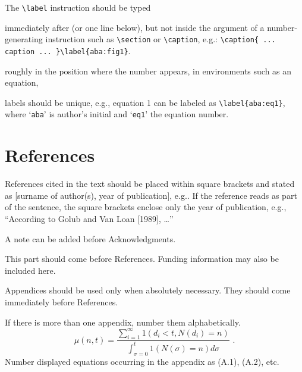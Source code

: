 \documentclass{ws-ijbc}
\begin{document}
The \verb|\label| instruction should be typed
\begin{itemlist}
\item immediately after (or one line below), but not inside the argument of
a number-generating instruction such as \verb|\section| or \verb|\caption|, e.g.:
\verb|\caption{ ... caption ... }\label{aba:fig1}|.
\item roughly in the position where the number appears, in environments
such as an equation,
\item labels should be unique, e.g., equation 1 can be labeled as
\verb|\label{aba:eq1}|, where `{\tt aba}' is author's initial and
`{\tt eq1}' the equation number.
\end{itemlist}

\section{References}
References cited in the text should be placed within square
brackets and stated as [surname of author(s), year of
publication], e.g.. If the reference reads as part of
the sentence, the square brackets enclose only the year of
publication, e.g., ``According to Golub and Van Loan [1989], \ldots''

 \noindent A note can be added before
Acknowledgments.

 \noindent This part should come
before References. Funding information may also be included here.

 \noindent Appendices should be used only
when absolutely necessary. They should come immediately before
References.

\appendix{}
If there is more than one appendix, number them alphabetically.
\begin{equation}
\mu(n, t) = \frac{\displaystyle\sum^\infty_{i=1} 1(d_i < t, N(d_i) = n)}
{\displaystyle\int^t_{\sigma=0} 1(N(\sigma) = n)d\sigma}\,\,
.\label{that}
\end{equation}
Number displayed equations occurring in the appendix as (A.1),
(A.2), etc.



\end{document}
